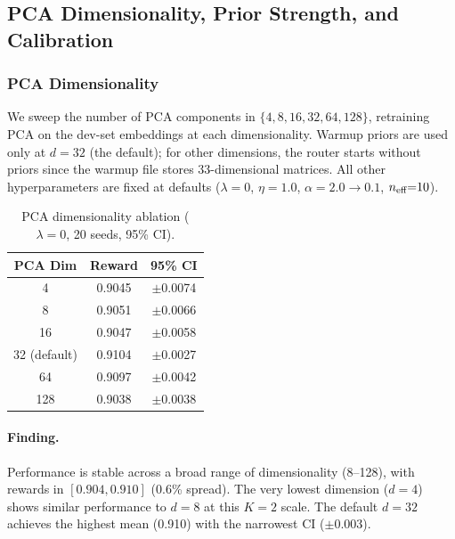 
\subsection{PCA Dimensionality, Prior Strength, and Calibration}
\label{appendix:pca_neff}

\subsubsection{PCA Dimensionality}

We sweep the number of PCA components in $\{4, 8, 16, 32, 64, 128\}$, retraining
PCA on the dev-set embeddings at each dimensionality.  Warmup priors are used
only at $d{=}32$ (the default); for other dimensions, the router starts
without priors since the warmup file stores 33-dimensional matrices.
All other hyperparameters are fixed at defaults
($\lambda{=}0$, $\eta{=}1.0$, $\alpha{=}2.0{\to}0.1$, $n_{\text{eff}}{=}10$).

\begin{table}[h]
\centering
\caption{PCA dimensionality ablation ($\lambda{=}0$, 20 seeds, 95\% CI).}
\label{tab:pca_ablation}
\small
\begin{tabular}{@{}ccc@{}}
\toprule
\textbf{PCA Dim} & \textbf{Reward} & \textbf{95\% CI} \\
\midrule
4                 & 0.9045 & $\pm$0.0074 \\
8                 & 0.9051 & $\pm$0.0066 \\
16                & 0.9047 & $\pm$0.0058 \\
32 (default)      & 0.9104 & $\pm$0.0027 \\
64                & 0.9097 & $\pm$0.0042 \\
128               & 0.9038 & $\pm$0.0038 \\
\bottomrule
\end{tabular}
\end{table}

\paragraph{Finding.}
Performance is stable across a broad range of dimensionality (8--128),
with rewards in $[0.904, 0.910]$ (0.6\% spread).  The very lowest
dimension ($d{=}4$) shows similar performance to $d{=}8$ at this $K{=}2$ scale.
The default $d{=}32$ achieves the highest mean (0.910) with the
narrowest CI ($\pm 0.003$).

